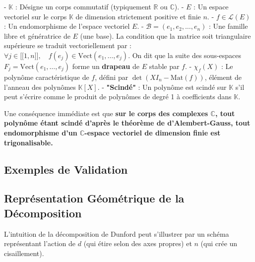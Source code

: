 \documentclass[11pt,a4paper]{article}
\begin{document}
- \textbf{$\mathbb{K}$} : Désigne un corps commutatif (typiquement $\mathbb{R}$ ou $\mathbb{C}$).
- \textbf{$E$} : Un espace vectoriel sur le corps $\mathbb{K}$ de dimension strictement positive et finie $n$.
- \textbf{$f \in \mathcal{L}(E)$} : Un endomorphisme de l'espace vectoriel $E$.
- \textbf{$\mathcal{B} = (e_1, e_2, \ldots, e_n)$} : Une famille libre et génératrice de $E$ (une base). La condition que la matrice soit triangulaire supérieure se traduit vectoriellement par : $\forall j \in \mathopen{[\![} 1, n \mathclose{]\!]}, \quad f(e_j) \in \text{Vect}(e_1, \ldots, e_j)$. On dit que la suite des sous-espaces $F_j = \text{Vect}(e_1, \ldots, e_j)$ forme un \textbf{drapeau} de $E$ stable par $f$.
- \textbf{$\chi_f(X)$} : Le polynôme caractéristique de $f$, défini par $\det(XI_n - \text{Mat}(f))$, élément de l'anneau des polynômes $\mathbb{K}[X]$.
- \textbf{"Scindé"} : Un polynôme est scindé sur $\mathbb{K}$ s'il peut s'écrire comme le produit de polynômes de degré 1 à coefficients dans $\mathbb{K}$.

Une conséquence immédiate est que \textbf{sur le corps des complexes $\mathbb{C}$, tout polynôme étant scindé d'après le théorème de d'Alembert-Gauss, tout endomorphisme d'un $\mathbb{C}$-espace vectoriel de dimension finie est trigonalisable.}

\subsection{Exemples de Validation}
\subsection{Représentation Géométrique de la Décomposition}

L'intuition de la décomposition de Dunford peut s'illustrer par un schéma représentant l'action de $d$ (qui étire selon des axes propres) et $n$ (qui crée un cisaillement).
\end{document}
